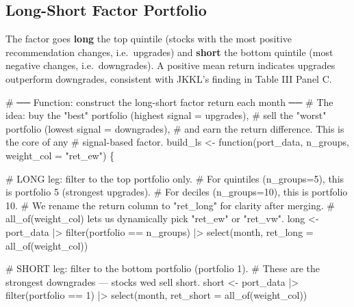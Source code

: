 \documentclass[
  letterpaper,
  DIV=11,
  numbers=noendperiod]{scrartcl}
\newenvironment{Shaded}{\begin{snugshade}}{\end{snugshade}}
\newcommand{\AttributeTok}[1]{\textcolor[rgb]{0.40,0.45,0.13}{#1}}
\newcommand{\CommentTok}[1]{\textcolor[rgb]{0.37,0.37,0.37}{#1}}
\newcommand{\ControlFlowTok}[1]{\textcolor[rgb]{0.00,0.23,0.31}{#1}}
\newcommand{\DecValTok}[1]{\textcolor[rgb]{0.68,0.00,0.00}{#1}}
\newcommand{\FunctionTok}[1]{\textcolor[rgb]{0.28,0.35,0.67}{#1}}
\newcommand{\NormalTok}[1]{\textcolor[rgb]{0.00,0.23,0.31}{#1}}
\newcommand{\OtherTok}[1]{\textcolor[rgb]{0.00,0.23,0.31}{#1}}
\newcommand{\SpecialCharTok}[1]{\textcolor[rgb]{0.37,0.37,0.37}{#1}}
\newcommand{\StringTok}[1]{\textcolor[rgb]{0.13,0.47,0.30}{#1}}
\begin{document}
\subsection{Long-Short Factor
Portfolio}\label{long-short-factor-portfolio}

The factor goes \textbf{long} the top quintile (stocks with the most
positive recommendation changes, i.e.~upgrades) and \textbf{short} the
bottom quintile (most negative changes, i.e.~downgrades). A positive
mean return indicates upgrades outperform downgrades, consistent with
JKKL's finding in Table III Panel C.

\begin{Shaded}
\begin{Highlighting}[]
\CommentTok{\# ── Function: construct the long{-}short factor return each month ──}
\CommentTok{\# The idea: buy the "best" portfolio (highest signal = upgrades),}
\CommentTok{\# sell the "worst" portfolio (lowest signal = downgrades),}
\CommentTok{\# and earn the return difference. This is the core of any}
\CommentTok{\# signal{-}based factor.}
\NormalTok{build\_ls }\OtherTok{\textless{}{-}} \ControlFlowTok{function}\NormalTok{(port\_data, n\_groups, }\AttributeTok{weight\_col =} \StringTok{"ret\_ew"}\NormalTok{) \{}
  
  \CommentTok{\# LONG leg: filter to the top portfolio only.}
  \CommentTok{\# For quintiles (n\_groups=5), this is portfolio 5 (strongest upgrades).}
  \CommentTok{\# For deciles (n\_groups=10), this is portfolio 10.}
  \CommentTok{\# We rename the return column to "ret\_long" for clarity after merging.}
  \CommentTok{\# all\_of(weight\_col) lets us dynamically pick "ret\_ew" or "ret\_vw".}
\NormalTok{  long  }\OtherTok{\textless{}{-}}\NormalTok{ port\_data }\SpecialCharTok{|\textgreater{}} \FunctionTok{filter}\NormalTok{(portfolio }\SpecialCharTok{==}\NormalTok{ n\_groups) }\SpecialCharTok{|\textgreater{}}
    \FunctionTok{select}\NormalTok{(month, }\AttributeTok{ret\_long =} \FunctionTok{all\_of}\NormalTok{(weight\_col))}
  
  \CommentTok{\# SHORT leg: filter to the bottom portfolio (portfolio 1).}
  \CommentTok{\# These are the strongest downgrades — stocks we\textquotesingle{}d sell short.}
\NormalTok{  short }\OtherTok{\textless{}{-}}\NormalTok{ port\_data }\SpecialCharTok{|\textgreater{}} \FunctionTok{filter}\NormalTok{(portfolio }\SpecialCharTok{==} \DecValTok{1}\NormalTok{) }\SpecialCharTok{|\textgreater{}}
    \FunctionTok{select}\NormalTok{(month, }\AttributeTok{ret\_short =} \FunctionTok{all\_of}\NormalTok{(weight\_col))}
  

\end{Highlighting}
\end{Shaded}
\end{document}

